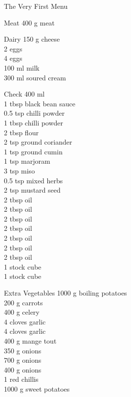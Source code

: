 \begin{menu}{The Very First Menu}
\begin{shoppinglist}{Meat}
      400 g meat \\ 
      \end{shoppinglist}%
      \begin{shoppinglist}{Dairy}
      150 g cheese \\ 
      2  eggs \\ 
      4  eggs \\ 
      100 ml milk \\ 
      300 ml soured cream \\ 
      \end{shoppinglist}%
      \par\vfil %
      \vfil\clearpage %
      \begin{shoppinglist}{Check}
      400 ml  \\ 
      1 tbsp black bean sauce \\ 
      0.5 tsp chilli powder \\ 
      1 tbsp chilli powder \\ 
      2 tbsp flour \\ 
      2 tsp ground coriander \\ 
      1 tsp ground cumin \\ 
      1 tsp marjoram \\ 
      3 tsp miso \\ 
      0.5 tsp mixed herbs \\ 
      2 tsp mustard seed \\ 
      2 tbsp oil \\ 
      2 tbsp oil \\ 
      2 tbsp oil \\ 
      2 tbsp oil \\ 
      2 tbsp oil \\ 
      2 tbsp oil \\ 
      2 tbsp oil \\ 
      1  stock cube \\ 
      1  stock cube \\ 
      \end{shoppinglist}%
      \begin{shoppinglist}{Extra Vegetables}
      1000 g boiling potatoes \\ 
      200 g carrots \\ 
      400 g celery \\ 
      4 cloves garlic \\ 
      4 cloves garlic \\ 
      400 g mange tout \\ 
      350 g onions \\ 
      700 g onions \\ 
      400 g onions \\ 
      1  red chillis \\ 
      1000 g sweet potatoes \\ 
      \end{shoppinglist}%
      \par\vfil %
    \vfil\clearpage
  

\end{menu}
